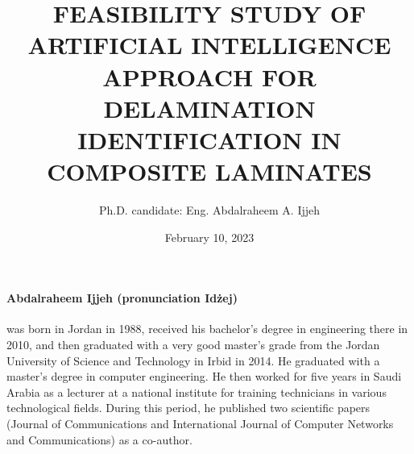 \documentclass[12pt,a4paper]{article}
\date{February 10, 2023}
\title{FEASIBILITY STUDY OF ARTIFICIAL INTELLIGENCE APPROACH FOR DELAMINATION IDENTIFICATION IN COMPOSITE LAMINATES}
\author{Ph.D. candidate: Eng. Abdalraheem A. Ijjeh}
\begin{document}
	\justifying
	\noindent
	\footnotesize
	\paragraph{Abdalraheem Ijjeh (pronunciation Idżej)}was born in Jordan in 1988, received his bachelor's degree in engineering there in 2010, and then graduated with a very good master's grade from the Jordan University of Science and Technology in Irbid in 2014.
	He graduated with a master's degree in computer engineering. 
	He then worked for five years in Saudi Arabia as a lecturer at a national institute for training technicians in various technological fields.
	During this period, he published two scientific papers (Journal of Communications and International Journal of Computer Networks and Communications) as a co-author.
	
	\noindent
\end{document}
